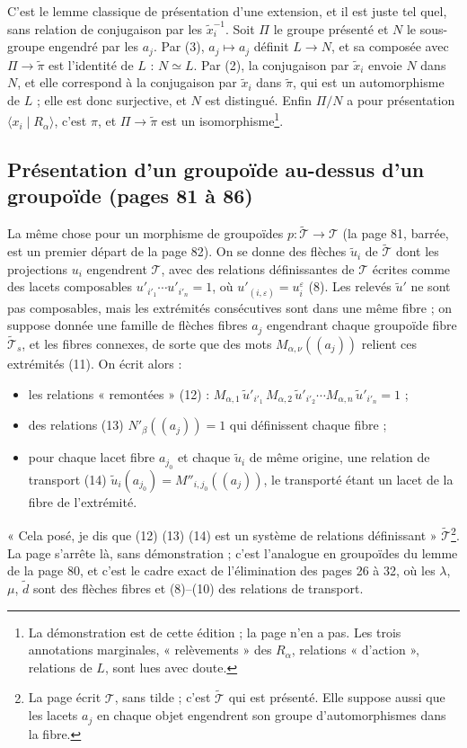 \documentclass[11pt,a4paper]{article}
\begin{document}
C'est le lemme classique de présentation d'une extension, et il est juste tel
quel, sans relation de conjugaison par les $\tilde x_i^{-1}$. Soit $\Pi$ le
groupe présenté et $N$ le sous-groupe engendré par les $a_j$. Par (3), $a_j
\mapsto a_j$ définit $L \to N$, et sa composée avec $\Pi \to \tilde\pi$ est
l'identité de $L$ : $N \simeq L$. Par (2), la conjugaison par $\tilde x_i$
envoie $N$ dans $N$, et elle correspond à la conjugaison par $\tilde x_i$ dans
$\tilde\pi$, qui est un automorphisme de $L$ ; elle est donc surjective, et
$N$ est distingué. Enfin $\Pi/N$ a pour présentation $\langle x_i \mid
R_\alpha \rangle$, c'est $\pi$, et $\Pi \to \tilde\pi$ est un
isomorphisme\footnote{La démonstration est de cette édition ; la page n'en a
pas. Les trois annotations marginales, « relèvements » des $R_\alpha$,
relations « d'action », relations de $L$, sont lues avec doute.}.

\subsection*{Présentation d'un groupoïde au-dessus d'un groupoïde (pages 81 à
86)}

La même chose pour un morphisme de groupoïdes $p : \widetilde{\mathcal{T}}
\to \mathcal{T}$ (la page 81, barrée, est un premier départ de la page 82).
On se donne des flèches $\tilde u_i$ de $\widetilde{\mathcal{T}}$ dont les
projections $u_i$ engendrent $\mathcal{T}$, avec des relations définissantes
de $\mathcal{T}$ écrites comme des lacets composables $u'_{i'_1} \cdots
u'_{i'_n} = 1$, où $u'_{(i,\varepsilon)} = u_i^{\varepsilon}$ (8). Les relevés
$\tilde u'$ ne sont pas composables, mais les extrémités consécutives sont
dans une même fibre ; on suppose donnée une famille de flèches fibres $a_j$
engendrant chaque groupoïde fibre $\widetilde{\mathcal{T}}_s$, et les fibres
connexes, de sorte que des mots $M_{\alpha,\nu}((a_j))$ relient ces extrémités
(11). On écrit alors :
\begin{itemize}
\item les relations « remontées » (12) : $M_{\alpha,1}\, \tilde u'_{i'_1}\,
M_{\alpha,2}\, \tilde u'_{i'_2} \cdots M_{\alpha,n}\, \tilde u'_{i'_n} = 1$ ;
\item des relations (13) $N'_\beta((a_j)) = 1$ qui définissent chaque fibre ;
\item pour chaque lacet fibre $a_{j_0}$ et chaque $\tilde u_i$ de même
origine, une relation de transport (14) $\tilde u_i(a_{j_0}) =
M''_{i,j_0}((a_j))$, le transporté étant un lacet de la fibre de
l'extrémité.
\end{itemize}
« Cela posé, je dis que (12) (13) (14) est un système de relations
définissant » $\widetilde{\mathcal{T}}$\footnote{La page écrit $\mathcal{T}$,
sans tilde ; c'est $\widetilde{\mathcal{T}}$ qui est présenté. Elle suppose
aussi que les lacets $a_j$ en chaque objet engendrent son groupe
d'automorphismes dans la fibre.}. La page s'arrête là, sans démonstration ;
c'est l'analogue en groupoïdes du lemme de la page 80, et c'est le cadre
exact de l'élimination des pages 26 à 32, où les $\lambda$, $\mu$, $\tilde d$
sont des flèches fibres et (8)--(10) des relations de transport.
\end{document}
